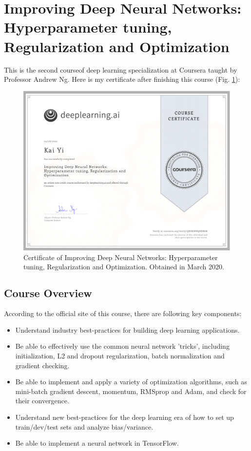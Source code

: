\section{Improving Deep Neural Networks: Hyperparameter tuning, Regularization and Optimization}
This is the second courseof deep learning specialization at Coursera taught by Professor Andrew Ng. Here is my certificate after finishing this course (Fig. \ref{course2-cert}):

\begin{figure}[!htbp]
    \centering
    \includegraphics[width=1.0\textwidth]{img/C2-Certificate.pdf}
    \caption{Certificate of Improving Deep Neural Networks: Hyperparameter tuning, Regularization and Optimization. Obtained in March 2020.}
    \label{course2-cert}
\end{figure}

\subsection{Course Overview}
According to the official site of this course, there are following key components:

\begin{itemize}
    \item Understand industry best-practices for building deep learning applications.
    \item Be able to effectively use the common neural network 'tricks', including initialization, L2 and dropout regularization, batch normalization and gradient checking.
    \item Be able to implement and apply a variety of optimization algorithms, such as mini-batch gradient descent, momentum, RMSprop and Adam, and check for their convergence.
    \item Understand new best-practices for the deep learning era of how to set up train/dev/test sets and analyze bias/variance.
    \item Be able to implement a neural network in TensorFlow.
\end{itemize}

